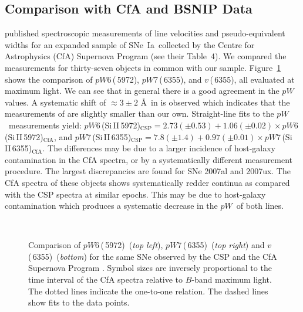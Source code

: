 \documentclass[apj]{emulateapj-rtx4}
\newcommand{\ew}{$pW$}
\newcommand{\pwsix}{$pW$6\,(\ion{Si}{2}\,5972)}
\newcommand{\pwseven}{$pW$7\,(\ion{Si}{2}\,6355)}
\newcommand{\vsix}{$v$\,(\ion{Si}{2}\,6355)}
\newcommand{\sneia}{SNe~Ia}
\begin{document}
\subsection{Comparison with CfA and BSNIP Data}
\citet{blondin12} published spectroscopic measurements of line
velocities and pseudo-equivalent widths for an expanded sample of
\sneia\ collected by the Centre for Astrophysics (CfA) Supernova
Program (see their Table~4). We compared the measurements for
thirty-seven objects in common with our
sample. Figure~\ref{fig:compcfa} shows the comparison of \pwsix,
\pwseven, and \vsix, all evaluated at maximum light. We can see that
in general there is a good agreement in the 
$pW$ values. A systematic shift of $\approx 3 \pm 2$ \AA\ in is
observed which indicates that the measurements of \citet{blondin12}
are slightly smaller than our own. Straight-line fits to the
\ew\ measurements yield: $pW$6\,(Si\,II\,5972)$_{\mathrm{CSP}}=2.73
(\pm 0.53) + 1.06 (\pm 0.02) \times$$pW$6\,(Si\,II\,5972)$_{\mathrm{CfA}}$, and
$pW$7\,(Si\,II\,6355)$_{\mathrm{CSP}}=7.8 (\pm 1.4) + 0.97 (\pm 0.01)
\times$$pW$7\,(Si\,II\,6355)$_{\mathrm{CfA}}$.
The differences may be due to a larger incidence
of host-galaxy contamination in the CfA spectra, or by a
systematically different measurement procedure. The largest
discrepancies are found for SNe 2007al and 2007ux. The
CfA spectra of these objects shows systematically redder
  continua as compared with the CSP spectra at
similar epochs. This may be due to host-galaxy contamination which
produces a systematic decrease in the \ew\ of both  lines.

\begin{figure}[htpb]%
\\
\caption{Comparison of \pwsix\ ({\em top left}), \pwseven\ ({\em top
    right}) and \vsix\ ({\em bottom}) for the same SNe
  observed by the CSP and the CfA Supernova Program
  \citep{blondin12}. Symbol sizes are inversely proportional to the
  time interval of the CfA spectra relative to $B$-band maximum
  light. The dotted lines indicate the one-to-one relation. The
  dashed lines show fits to the data points.\label{fig:compcfa}} 
\end{figure}
\end{document}
